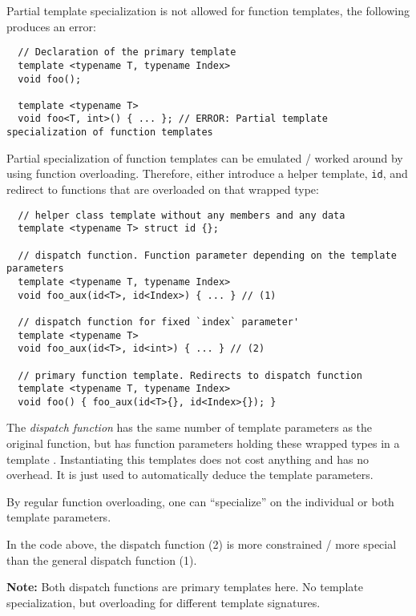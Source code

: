 Partial template specialization is not allowed for function templates, \eg the following produces an error:
%
\begin{verbatim}
  // Declaration of the primary template
  template <typename T, typename Index>
  void foo();

  template <typename T>
  void foo<T, int>() { ... }; // ERROR: Partial template specialization of function templates
\end{verbatim}

\begin{rem}
  Partial specialization of function templates can be emulated / worked around by using function overloading.
  Therefore, either introduce a helper template, \eg \texttt{id}, and redirect to functions that are overloaded
  on that wrapped type:
  \begin{verbatim}
  // helper class template without any members and any data
  template <typename T> struct id {};

  // dispatch function. Function parameter depending on the template parameters
  template <typename T, typename Index>
  void foo_aux(id<T>, id<Index>) { ... } // (1)

  // dispatch function for fixed `index` parameter'
  template <typename T>
  void foo_aux(id<T>, id<int>) { ... } // (2)

  // primary function template. Redirects to dispatch function
  template <typename T, typename Index>
  void foo() { foo_aux(id<T>{}, id<Index>{}); }
  \end{verbatim}

  The \emph{dispatch function} has the same number of template parameters as the original function, but has function parameters holding
  these wrapped types in a template . Instantiating this templates does not cost anything and has no overhead. It is just
  used to automatically deduce the template parameters.

  By regular function overloading, one can ``specialize'' on the individual or both template parameters.

  In the code above, the dispatch function (2) is more constrained / more special than the general dispatch function (1).

  \textbf{Note:} Both dispatch functions are primary templates here. No template specialization, but overloading for different template
  signatures.
\end{rem}


